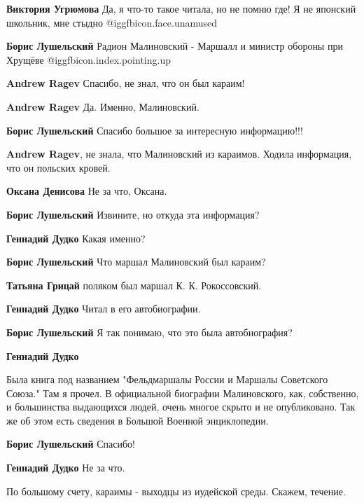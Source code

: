 \begin{itemize}
\begin{itemize}
\textbf{Виктория Угрюмова} Да, я что-то такое читала, но не помню где! Я не японский школьник, мне стыдно  @igg{fbicon.face.unamused} 

\textbf{Борис Лушельский} Радион Малиновский - Маршалл и министр обороны при Хрущёве @igg{fbicon.index.pointing.up}

\begin{itemize} %
\textbf{Andrew Ragev} Спасибо, не знал, что он был караим!

\textbf{Andrew Ragev}
Да. Именно, Малиновский.

\textbf{Борис Лушельский} Спасибо большое за интересную информацию!!!

\textbf{Andrew Ragev}, не знала, что Малиновский из караимов. Ходила информация, что он польских кровей.

\textbf{Оксана Денисова}
Не за что, Оксана.

\textbf{Борис Лушельский} Извините, но откуда эта информация?

\textbf{Геннадий Дудко}
Какая именно?

\textbf{Борис Лушельский} Что маршал Малиновский был караим?

\textbf{Татьяна Грицай} поляком был маршал К. К. Рокоссовский.

\textbf{Геннадий Дудко}
Читал в его автобиографии.

\textbf{Борис Лушельский} Я так понимаю, что это была автобиография?

\textbf{Геннадий Дудко}

Была книга под названием "Фельдмаршалы России и Маршалы Советского Союза." Там
я прочел. В официальной биографии Малиновского, как, собственно, и большинства
выдающихся людей, очень многое скрыто и не опубликовано. Так же об этом есть
сведения в Большой Военной энциклопедии.

\textbf{Борис Лушельский} Спасибо!

\textbf{Геннадий Дудко}
Не за что.

\end{itemize} %


По большому счету, караимы - выходцы из иудейской среды. Скажем, течение.


\end{itemize}
\end{itemize}

